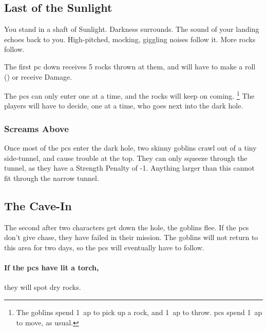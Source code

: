 \begin{multicols}{2}
\renewcommand\npcsymbol{\gls{night}}

\subsection{Last of the Sunlight}

\begin{boxtext}
  You stand in a shaft of Sunlight.
  Darkness surrounds.
  The sound of your landing echoes back to you.
  High-pitched, mocking, giggling noises follow it.
  More rocks follow.
\end{boxtext}

The first \gls{pc} down receives 5 rocks thrown at them, and will have to make a  roll (\tn[10]) or receive  Damage.

The \glspl{pc} can only enter one at a time, and the rocks will keep on coming.%
\footnote{The goblins spend 1~\gls{ap} to pick up a rock, and 1~\gls{ap} to throw.
\Glspl{pc} spend 1~\gls{ap} to move, as usual.}
The players will have to decide, one at a time, who goes next into the dark hole.

\subsubsection{Screams Above}

Once most of the \glspl{pc} enter the dark hole, two skinny goblins crawl out of a tiny side-tunnel, and cause trouble at the top.
They can only squeeze through the tunnel, as they have a Strength Penalty of -1.
Anything larger than this cannot fit through the narrow tunnel.

\playCommentaryCaveIn

\subsection{The Cave-In}

The second after two characters get down the hole, the goblins flee.
If the \glspl{pc} don't give chase, they have failed in their mission.
The goblins will not return to this area for two days, so the \glspl{pc} will eventually have to follow.

\paragraph{If the \glspl{pc} have lit a torch,}
they will spot dry rocks.


\end{multicols}
